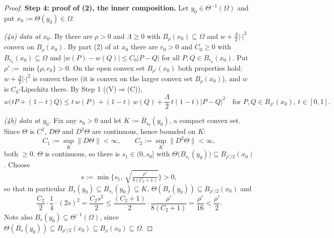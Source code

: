\begin{proof}
\medskip\noindent\textbf{Step 4: proof of (2), the inner composition.} Let
$y_0\in\Theta^{-1}(\Omega)$ and put $x_0:=\Theta(y_0)\in\Omega$.

\emph{(4a) data at $x_0$.} By  there are $\rho>0$ and
$\Lambda\ge0$ with $B_\rho(x_0)\subseteq\Omega$ and $w+\tfrac\Lambda2|\cdot|^{2}$ convex on
$B_\rho(x_0)$. By part (2) of  at $x_0$ there are $r_0>0$ and
$C_0\ge0$ with $B_{r_0}(x_0)\subseteq\Omega$ and $|w(P)-w(Q)|\le C_0|P-Q|$ for all
$P,Q\in B_{r_0}(x_0)$. Put $\rho':=\min\{\rho,r_0\}>0$. On the open convex set
$B_{\rho'}(x_0)$ both properties hold: $w+\tfrac\Lambda2|\cdot|^{2}$ is convex there (it is
convex on the larger convex set $B_\rho(x_0)$), and $w$ is $C_0$-Lipschitz there. By Step 1
((V)$\Rightarrow$(C)),
\[
 w\big(tP+(1-t)Q\big)\le t\,w(P)+(1-t)\,w(Q)+\frac\Lambda2\,t(1-t)|P-Q|^{2}
 \quad\text{for }P,Q\in B_{\rho'}(x_0),\ t\in[0,1]. \tag{6}
\]

\emph{(4b) data at $y_0$.} Fix any $s_0>0$ and let $K:=\overline B_{s_0}(y_0)$, a compact
convex set. Since $\Theta$ is $C^{2}$, $D\Theta$ and $D^{2}\Theta$ are continuous, hence
bounded on $K$:
\[
 C_1:=\sup_K\|D\Theta\|<\infty,\qquad C_2:=\sup_K\|D^{2}\Theta\|<\infty ,
\]
both $\ge0$. $\Theta$ is continuous, so there is $s_1\in(0,s_0]$ with
$\Theta\big(B_{s_1}(y_0)\big)\subseteq B_{\rho'/2}(x_0)$. Choose
\[
 s:=\min\Big\{s_1,\ \sqrt{\tfrac{\rho'}{8(C_2+1)}}\Big\}>0 ,
\]
so that in particular $B_s(y_0)\subseteq B_{s_1}(y_0)\subseteq K$,
$\Theta(B_s(y_0))\subseteq B_{\rho'/2}(x_0)$ and
\[
 \frac{C_2}{2}\cdot\frac14\cdot(2s)^{2}=\frac{C_2 s^{2}}{2}
  \le\frac{(C_2+1)}{2}\cdot\frac{\rho'}{8(C_2+1)}=\frac{\rho'}{16}<\frac{\rho'}{2}. \tag{7}
\]
Note also $B_s(y_0)\subseteq\Theta^{-1}(\Omega)$, since
$\Theta(B_s(y_0))\subseteq B_{\rho'/2}(x_0)\subseteq B_\rho(x_0)\subseteq\Omega$.


\end{proof}
